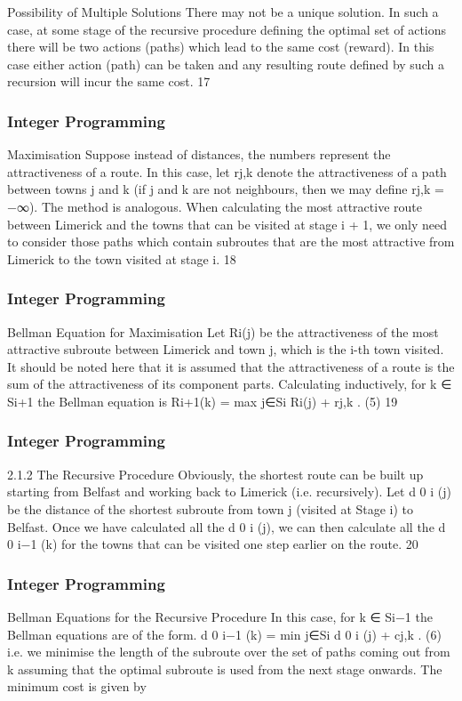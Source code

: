 \begin{frame}
Possibility of Multiple Solutions
There may not be a unique solution.
In such a case, at some stage of the recursive procedure defining
the optimal set of actions there will be two actions (paths) which
lead to the same cost (reward).
In this case either action (path) can be taken and any resulting
route defined by such a recursion will incur the same cost.
17 \end{frame}  \begin{frame} \frametitle{Integer Programming}     
Maximisation
Suppose instead of distances, the numbers represent the
attractiveness of a route.
In this case, let rj,k denote the attractiveness of a path between
towns j and k (if j and k are not neighbours, then we may define
rj,k = −∞).
The method is analogous. When calculating the most attractive
route between Limerick and the towns that can be visited at stage
i + 1, we only need to consider those paths which contain
subroutes that are the most attractive from Limerick to the town
visited at stage i.
18 \end{frame}  \begin{frame} \frametitle{Integer Programming}     
Bellman Equation for Maximisation
Let Ri(j) be the attractiveness of the most attractive subroute
between Limerick and town j, which is the i-th town visited.
It should be noted here that it is assumed that the attractiveness
of a route is the sum of the attractiveness of its component parts.
Calculating inductively, for k ∈ Si+1 the Bellman equation is
Ri+1(k) = max
j∈Si
{Ri(j) + rj,k }. (5)
19 \end{frame}  \begin{frame} \frametitle{Integer Programming}     
2.1.2 The Recursive Procedure
Obviously, the shortest route can be built up starting from Belfast
and working back to Limerick (i.e. recursively).
Let d
0
i
(j) be the distance of the shortest subroute from town j
(visited at Stage i) to Belfast.
Once we have calculated all the d
0
i
(j), we can then calculate all the
d
0
i−1
(k) for the towns that can be visited one step earlier on the
route.
20 \end{frame}  \begin{frame} \frametitle{Integer Programming}     
Bellman Equations for the Recursive Procedure
In this case, for k ∈ Si−1 the Bellman equations are of the form.
d
0
i−1
(k) = min
j∈Si
{d
0
i
(j) + cj,k }. (6)
i.e. we minimise the length of the subroute over the set of paths
coming out from k assuming that the optimal subroute is used
from the next stage onwards. The minimum cost is given by

\end{frame}
